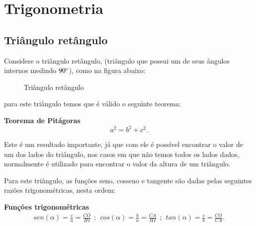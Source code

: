 \chapter{Trigonometria}

\section{Triângulo retângulo}
% 
  Considere o triângulo retângulo, (triângulo que possui um de seus ângulos internos medindo $90 \degree$), como na figura abaixo:
  \begin{figure}[H]
   \centering
   \caption{Triângulo retângulo}
  \end{figure}
 para este triângulo temos que é válido o seguinte teorema:
 
 \vskip0.3cm

\colorbox{azul}{
 \begin{minipage}{14.5cm}
 \begin{center}
 \textbf{Teorema de Pitágoras}
  \[a^2= b^2 + c^2.\]
 \end{center}
 \end{minipage}}
 
 \vskip0.3cm

 Este é um resultado importante, já que com ele é possível encontrar o valor de um dos lados do triângulo, nos casos em que não temos todos os lados dados, normalmente é utilizado para encontrar o valor da altura de um triângulo.
 
 Para este triângulo, as funções seno, cosseno e tangente são dadas pelas seguintes razões trigonométricas, nesta ordem:
  
 \vskip0.3cm

\colorbox{azul}{
 \begin{minipage}{14.5cm}
 \begin{center}
 \textbf{Funções trigonométricas}
  \begin{eqnarray*}
   sen(\alpha)= \frac{c}{a}= \frac{CO}{HI} \ \ ; \ \ cos(\alpha)= \frac{b}{a}= \frac{CA}{HI} \ \ ; \ \ tan(\alpha)= \frac{c}{b}= \frac{CO}{CA}.
 \end{eqnarray*}
 \end{center}
 \end{minipage}}
 
